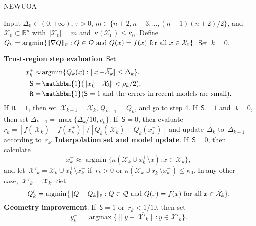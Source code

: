 \documentclass[11pt,a4paper,draft]{article}  %
\theoremstyle{definition}
\numberwithin{equation}{section}
\newcommand{\mbar}[1]{\,\overline{\!\!{#1}\!}} %
\DeclareMathOperator*{\argmax}{argmax}
\DeclareMathOperator*{\argmin}{argmin}
\DeclareMathOperator{\ind}{\mathbbm{1}}
\newcommand{\shortd}{\mathsf{S}}
\newcommand{\redrho}{\mathtt{R}}
\newcommand{\RR}{\mathbb{R}}
\newcommand{\Int}{\mathcal{X}}
\newcommand{\Qua}{\mathcal{Q}}
\newcommand{\sss}[1]{{\scriptscriptstyle{#1}}}
\newcommand{\get}{{\sss{+}}}
\newcommand{\drop}{{\sss{-}}}
\newcommand{\fro}{{\scriptscriptstyle{\textnormal{F}}}}
\begin{document}
\begin{algorithm}[htbp!]
    \caption{\label{alg:newuoa}NEWUOA}
    Input $\Delta_0\in (0,+\infty)$, $\tau>0$, $m\in \{n+2, n+3, \dots, (n+1)(n+2)/2\}$,
    and~$\Int_0\subset \RR^n$ with~$|\Int_0|=m$ and~$\kappa(\Int_0) \le \kappa_0$.
    Define~$Q_0 = \argmin\{\|\nabla Q\|_\fro \mathrel{:} Q\in \Qua~\text{and}~Q(x) = f(x) \text{ for all } x\in \Int_0\}$.
    Set~$k=0$.
    \begin{algorithmic}[1]
        \State \textbf{Trust-region step evaluation}.
        Set
        \begin{align}
             \label{eq:xgetn}
             x_k^\get \approx &\argmin\{Q_k(x)\mathrel{:} \|x-\mbar{\Int_k}\|\le \Delta_k\}.\\
            \label{eq:shortd}
            \shortd = &\ind(\|x_k^\get-\mbar{\Int_k}\| < \rho_k/2),\\
            \label{eq:redrho}
            \redrho = & \ind(\shortd=1\text{ and the errors in recent models are small}).
        \end{align}
        If~$\redrho = 1$, then set~$\Int_{k+1} = \Int_k$, $Q_{k+1} = Q_k$, and go to step 4.
        If~$\shortd=1$ and~$\redrho = 0$, then set $\Delta_{k+1} = \max\{\Delta_k/10, \rho_k\}$.
        If~$\shortd = 0$, then evaluate $r_k = [f(\mbar{\Int_k})-f(x_k^\get)]/[Q_k(\mbar{\Int_k})-Q_k(x_k^\get)]$
        and update~$\Delta_k$ to~$\Delta_{k+1}$ according to~$r_k$.
        \State \textbf{Interpolation set and model update}.
        If~$\shortd = 0$, then calculate
        \begin{equation}
            \label{eq:xdropn}
            x_k^\drop \approx \argmin\{\kappa(\Int_k\cup x_k^\get\setminus x) \mathrel{:} x \in
            \Int_k\},
        \end{equation}
        and let~$\Int'_{k} = \Int_k\cup x_k^\get\setminus x_k^\drop$
        if~$r_k>0$ or $\kappa(\Int_k\cup x_k^\get \setminus x_k^\drop) \le \kappa_0$. In
        any other case,~$\Int'_k=\Int_k$.~Set%
        \begin{equation}
            \label{eq:updateq1}
            {Q}'_k = \argmin\{\|Q-Q_k\|_\fro \mathrel{:} Q\in \Qua~\text{and}~Q(x) = f(x) \text{ for all } x \in
            \hat{\Int}_k\}.
        \end{equation}
        \State \textbf{Geometry improvement}.
        If~$\shortd = 1$ or~$r_k < 1/10$, then set
          \begin{equation}
              \label{eq:ydropn}
              y_k^\drop = \argmax\{\|y-\mbar{\Int'_k}\| \mathrel{:} y \in \Int'_k\}.

\end{equation}
\end{algorithmic}
\end{algorithm}
\end{document}
